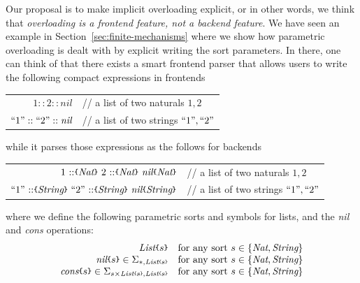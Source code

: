 \documentclass[UTF8,11pt]{article}
\theoremstyle{plain}
\theoremstyle{definition}
\theoremstyle{remark}
\newcommand{\Nat}{\textit{Nat}}
\newcommand{\String}{\textit{String}}
\newcommand{\List}{\textit{List}}
\newcommand{\nil}{\textit{nil}}
\newcommand{\cons}{\textit{cons}}
\newcommand{\parametric}[2]{{#1}\raisebox{.2ex}{\texttt{\footnotesize{\{}}}#2\raisebox{.2ex}{\texttt{\footnotesize{\}}}}}
\newcommand{\parametricscript}[2]{{#1}\raisebox{.2ex}{\texttt{\tiny{\{}}}#2\raisebox{.2ex}{\texttt{\tiny{\}}}}}
\newcommand{\doubleslash}{/\!/{ }}
\newcommand{\doublecolon}{::}
\newcommand{\quot}[1]{\mathrm{``#1"}}
\begin{document}
Our proposal is to make implicit overloading explicit, or in other words, we 
think that \emph{overloading is a frontend feature, not a backend feature}.
We have seen an example in Section~\ref{sec:finite-mechanisms} where we show 
how 
parametric overloading is dealt with by explicit writing the sort parameters.
In there, one can think of that there exists a smart frontend parser that 
allows users to write the following compact expressions in frontends
\begin{center}
\begin{tabular}{rl}
$1 \doublecolon 2 \doublecolon \nil$ 
& \doubleslash a list of two naturals $1, 2$ \\
$\quot{1} \doublecolon \quot{2} \doublecolon \nil$
& \doubleslash a list of two strings $\quot{1}, \quot{2}$ \\
\end{tabular}
\end{center}
while it parses those expressions as the follows for backends
\begin{center}
	\begin{tabular}{rl}
		$1 {\ \parametric{\doublecolon}{\Nat}\ } 2 {\ 
		\parametric{\doublecolon}{\Nat}\ } {\parametric{\nil}{\Nat}}$ 
& \doubleslash a list of two naturals $1, 2$ \\
$\quot{1} {\ \parametric{\doublecolon}{\String}\ } \quot{2} {\ 
	\parametric{\doublecolon}{\String}\ } {\parametric{\nil}{\String}}$ 
& \doubleslash a list of two strings $\quot{1}, \quot{2}$ 
	\end{tabular}
\end{center}
where we define the following parametric sorts and symbols for lists, and the 
{\nil} and {\cons} operations:
$$
\begin{array}{rl}
\parametric{\List}{s} &
\textrm{for any sort $s \in \{\Nat, \String\}$} \\
\parametric{\nil}{s} \in \Sigma_{*,\parametricscript{\List}{s}} &
\textrm{for any sort $s \in \{\Nat, \String\}$} \\
\parametric{\cons}{s} \in 
\Sigma_{s\times\parametricscript{\List}{s},\parametricscript{\List}{s}} &
\textrm{for any sort $s \in \{\Nat, \String\}$}
\end{array}
$$
\end{document}
